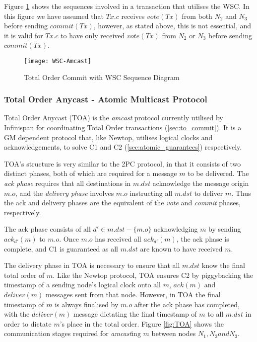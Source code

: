			Figure \ref{fig:total_order_wsc} shows the sequences involved in a transaction that utilises the WSC.  In this figure we have assumed that $Tx.c$ receives $vote(Tx)$ from both $N_2$ and $N_3$ before sending $commit(Tx)$, however, as stated above, this is not essential, and it is valid for $Tx.c$ to have only received $vote(Tx)$ from $N_2$ or $N_3$ before sending $commit(Tx)$.  
	        
	        \begin{figure}[htbp!] 
                \centering    
                \texttt{[image: WSC-Amcast]}
                \caption[Total Order Commit with Write Skew Check]{Total Order Commit with WSC Sequence Diagram}
                \label{fig:total_order_wsc}
            \end{figure}	      	                         
             
	        \subsubsection{Total Order Anycast - Atomic Multicast Protocol} \label{ssec:TOA_limations}
	        Total Order Anycast (TOA)\cite{Ruivo:2011:ETO:2120967.2121604} is the \emph{amcast} protocol currently utilised by Infinispan for coordinating Total Order transactions (\ref{sec:to_commit}).  It is a GM dependent protocol that, like Newtop\citep{Ezhilchelvan:1995:NFG:876885.880005}, utilises logical clocks and acknowledgements, to solve C1 and C2 (\ref{sec:atomic_guarantees}) respectively.  
	        
			TOA's structure is very similar to the 2PC protocol, in that it consists of two distinct phases, both of which are required for a message $m$ to be delivered.  The \emph{ack phase} requires that all destinations in $m.dst$ acknowledge the message origin $m.o$, and the \emph{delivery phase} involves $m.o$ instructing all $m.dst$ to deliver $m$.  Thus the ack and delivery phases are the equivalent of the \emph{vote} and \emph{commit} phases, respectively.  
	        
			The ack phase consists of all $d' \in m.dst-\{m.o\}$ acknowledging $m$ by sending $ack_{d'}(m)$ to $m.o$.  Once $m.o$ has received all $ack_{d'}(m)$, the ack phase is complete, and C1 is guaranteed as all $m.dst$ are known to have received $m$.  
			
			The delivery phase in TOA is necessary to ensure that all $m.dst$ know the final total order of $m$. Like the Newtop protocol, TOA ensures C2 by piggybacking the timestamp of a sending node's logical clock onto all $m$, $ack(m)$ and $deliver(m)$ messages sent from that node.  However, in TOA the final timestamp of $m$ is always finalised by $m.o$ after the ack phase has completed, with the $deliver(m)$ message dictating the final timestamp of $m$ to all $m.dst$ in order to dictate $m$'s place in the total order.  Figure \ref{fig:TOA} shows the communication stages required for \emph{amcast}ing $m$ between nodes $N_1, N_2 and N_3$.  
			
